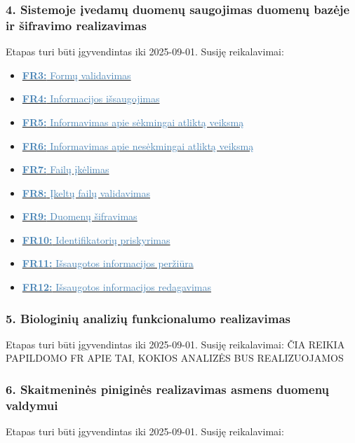 \documentclass[12pt]{article}
\begin{document}
\subsubsection*{\noindent \textbf{4.} Sistemoje įvedamų duomenų saugojimas
duomenų bazėje ir šifravimo realizavimas}

\noindent Etapas turi būti įgyvendintas iki 2025-09-01. Susiję reikalavimai:

\begin{itemize}[leftmargin=0.3cm, itemsep=-7pt, topsep=1pt, after=\vspace{-1em}]
    \item \hyperlink{FR3}{\textcolor{steelblue}{\textbf{FR3:} Formų
    validavimas}}
    \item \hyperlink{FR4}{\textcolor{steelblue}{\textbf{FR4:} Informacijos
    išsaugojimas}}
    \item \hyperlink{FR5}{\textcolor{steelblue}{\textbf{FR5:} Informavimas apie
    sėkmingai atliktą veiksmą}}
    \item \hyperlink{FR6}{\textcolor{steelblue}{\textbf{FR6:} Informavimas apie
    nesėkmingai atliktą veiksmą}}
    \item \hyperlink{FR7}{\textcolor{steelblue}{\textbf{FR7:} Failų įkėlimas}}
    \item \hyperlink{FR8}{\textcolor{steelblue}{\textbf{FR8:} Įkeltų failų
    validavimas}}
    \item \hyperlink{FR9}{\textcolor{steelblue}{\textbf{FR9:} Duomenų
    šifravimas}}
    \item \hyperlink{FR10}{\textcolor{steelblue}{\textbf{FR10:} Identifikatorių
    priskyrimas}}
    \item \hyperlink{FR11}{\textcolor{steelblue}{\textbf{FR11:} Išsaugotos
    informacijos peržiūra}}
    \item \hyperlink{FR12}{\textcolor{steelblue}{\textbf{FR12:} Išsaugotos
    informacijos redagavimas}}
\end{itemize}

\subsubsection*{\noindent \textbf{5.} Biologinių analizių funkcionalumo
realizavimas}

\noindent Etapas turi būti įgyvendintas iki 2025-09-01. Susiję reikalavimai:
ČIA REIKIA PAPILDOMO FR APIE TAI, KOKIOS ANALIZĖS BUS REALIZUOJAMOS

\subsubsection*{\noindent \textbf{6.} Skaitmeninės piniginės realizavimas asmens
duomenų valdymui}
\noindent Etapas turi būti įgyvendintas iki 2025-09-01. Susiję reikalavimai:
\end{document}
